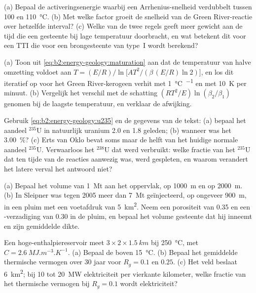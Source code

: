 \begin{exercise}[$\star\star$]\label{exo:b2:energy-geology:5}
(a) Bepaal de activeringsenergie waarbij een Arrhenius-snelheid verdubbelt tussen 100 en
\qty{110}{\celsius}. (b) Met welke factor groeit de snelheid van de Green River-reactie over hetzelfde
interval? (c) Welke van de twee regels geeft meer gewicht aan de tijd die een gesteente bij lage temperatuur doorbracht,
en wat betekent dit voor een TTI die voor een brongesteente van type~I wordt berekend?
\end{exercise}

\begin{exercise}[$\star\star$]\label{exo:b2:energy-geology:6}
(a) Toon uit \eqref{eq:b2:energy-geology:maturation} aan dat de temperatuur van halve omzetting voldoet aan
$T = (E/R)\big/\ln\bigl[A T^2/(\beta\,(E/R)\ln 2)\bigr]$, en los dit iteratief op voor het Green
River-kerogeen verhit met \qty{1}{\celsius\per\Myr} en met \qty{10}{K} per minuut. (b) Vergelijk het
verschil met de schatting $(RT^2/E)\ln(\beta_2/\beta_1)$ genomen bij de laagste temperatuur, en
verklaar de afwijking.
\end{exercise}

\begin{exercise}[$\star\star$]\label{exo:b2:energy-geology:7}
Gebruik \eqref{eq:b2:energy-geology:u235} en de gegevens van de tekst: (a) bepaal het aandeel $^{235}$U in
natuurlijk uranium \qty{2.0}{\Ga} en \qty{1.8}{\Ga} geleden; (b) wanneer was het \qty{3.00}{\percent}?
(c) Erts van Oklo bevat soms maar de helft van het huidige normale aandeel $^{235}$U. Verwaarloos het $^{238}$U
dat werd verbruikt: welke fractie van het $^{235}$U dat ten tijde van de reacties aanwezig was, werd gespleten, en
waarom verandert het latere verval het antwoord niet?
\end{exercise}

\begin{exercise}[$\star\star$]\label{exo:b2:energy-geology:8}
(a) Bepaal het volume van \qty{1}{Mt}  aan het oppervlak, op \qty{1000}{m} en op
\qty{2000}{m}. (b) In Sleipner was tegen 2005 meer dan \qty{7}{Mt} geïnjecteerd, op ongeveer
\qty{900}{m}, in een pluim met een voetafdruk van \qty{5}{km^2}. Neem een porositeit van 0.35 en een
-verzadiging van 0.30 in de pluim, en bepaal het volume gesteente dat hij inneemt en zijn gemiddelde dikte.
\end{exercise}

\begin{exercise}[$\star\star$]\label{exo:b2:energy-geology:9}
Een hoge-enthalpiereservoir meet $3 \times 2 \times \qty{1.5}{km}$ bij \qty{250}{\celsius}, met
$C = \qty{2.6}{MJ.m^{-3}.K^{-1}}$. (a) Bepaal de  boven \qty{15}{\celsius}. (b) Bepaal het
gemiddelde thermische vermogen over 30 jaar voor $R_g = 0.1$ en $0.25$. (c) Het veld beslaat \qty{6}{km^2};
bij 10 tot \qty{20}{MW} elektriciteit per vierkante kilometer, welke fractie van het thermische vermogen bij
$R_g = 0.1$ wordt elektriciteit?
\end{exercise}

